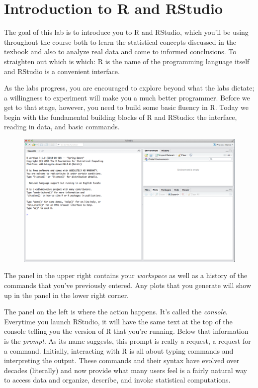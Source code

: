 \documentclass{article}\usepackage[]{graphicx}\usepackage[]{color}
\begin{document}

\section*{Introduction to R and RStudio}

The goal of this lab is to introduce you to R and RStudio, which you'll be using throughout the course both to learn the statistical concepts discussed in the texbook and also to analyze real data and come to informed conclusions.  To straighten out which is which: R is the name of the programming language itself and RStudio is a convenient interface.

As the labs progress, you are encouraged to explore beyond what the labs dictate; a willingness to experiment will make you a much better programmer.  Before we get to that stage, however, you need to build some basic fluency in R.  Today we begin with the fundamental building blocks of R and RStudio: the interface, reading in data, and basic commands.

\begin{figure}[h]
\centering
\includegraphics[width=4.5 in]{rInterface2014.png}
\end{figure}

The panel in the upper right contains your \emph{workspace} as well as a history of the commands that you've previously entered.  Any plots that you generate will show up in the panel in the lower right corner.

The panel on the left is where the action happens.  It's called the \emph{console}.  Everytime you launch RStudio, it will have the same text at the top of the console telling you the version of R that you're running.  Below that information is the \emph{prompt}.  As its name suggests, this prompt is really a request, a request for a command.  Initially, interacting with R is all about typing commands and interpreting the output. These commands and their syntax have evolved over decades (literally) and now provide what many users feel is a fairly natural way to access data and organize, describe, and invoke statistical computations.
\end{document}

